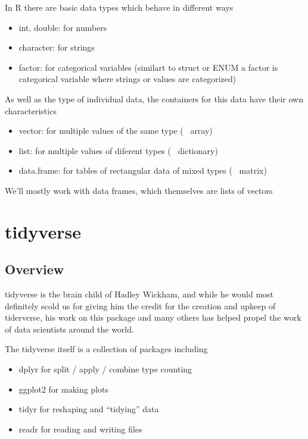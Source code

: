 \begin{flushleft}
In R there are basic data types which behave in different ways

\begin{itemize}
    \item int, double: for numbers
    \item character: for strings
    \item factor: for categorical variables (similart to struct or ENUM a factor is categorical variable where strings or values are categorized) 
\end{itemize}

As well as the type of individual data, the containers for this data have their own characteristics 

\begin{itemize}
    \item vector: for multiple values of the same type (~ array)
    \item list: for multiple values of diferent types (~ dictionary)
    \item data.frame: for tables of rectangular data of mixed types (~ matrix)
\end{itemize}

We'll mostly work with data frames, which themselves are lists of vectors

\end{flushleft}


\section{tidyverse}
\subsection{Overview}

\begin{flushleft}
tidyverse is the brain child of Hadley Wickham, and while he would most definitely scold us for giving him the credit for the creation and upkeep of tiderverse, his work on this package and many others has helped propel the work of data scientists around the world.
\end{flushleft}

\begin{flushleft}
The tidyverse itself is a collection of packages including
\begin{itemize}
    \item dplyr for split / apply / combine type counting
    \item ggplot2 for making plots
    \item tidyr for reshaping and “tidying” data
    \item readr for reading and writing files
\end{itemize}

\end{flushleft}

